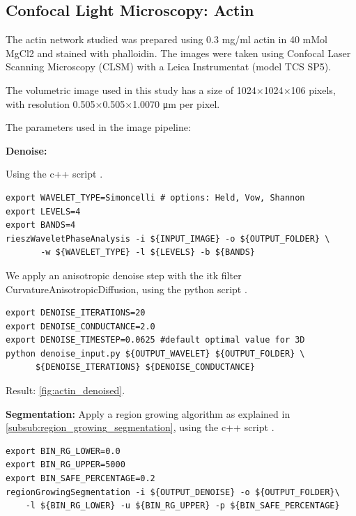 \subsection{Confocal Light Microscopy: Actin}%
\label{sub:actin}
The actin network studied was prepared using 0.3 mg/ml actin in 40 mMol MgCl2 and stained with phalloidin.
The images were taken using Confocal Laser Scanning Microscopy (CLSM) with a Leica Instrumentat (model TCS SP5).

The volumetric image used in this study has a size of 1024$\times$1024$\times$106 pixels, with resolution 0.505$\times$0.505$\times$1.0070 \si{\micro\metre} per pixel.

The parameters used in the image pipeline:

\textbf{Denoise:}

\noindent Using the c++ script  \cite{phcerdan_rieszwaveletphaseanalysis_2018}.
\begin{verbatim}
export WAVELET_TYPE=Simoncelli # options: Held, Vow, Shannon
export LEVELS=4
export BANDS=4
rieszWaveletPhaseAnalysis -i ${INPUT_IMAGE} -o ${OUTPUT_FOLDER} \
       -w ${WAVELET_TYPE} -l ${LEVELS} -b ${BANDS}
\end{verbatim}

We apply an anisotropic denoise step with the itk filter CurvatureAnisotropicDiffusion,
using the python script  \citetitle*{phcerdan_denoise_input_2018} \cite{phcerdan_denoise_input_2018}.

\begin{verbatim}
export DENOISE_ITERATIONS=20
export DENOISE_CONDUCTANCE=2.0
export DENOISE_TIMESTEP=0.0625 #default optimal value for 3D
python denoise_input.py ${OUTPUT_WAVELET} ${OUTPUT_FOLDER} \
      ${DENOISE_ITERATIONS} ${DENOISE_CONDUCTANCE}
\end{verbatim}

Result: \autoref{fig:actin_denoised}.

\textbf{Segmentation:}
Apply a region growing algorithm as explained in \autoref{subsub:region_growing_segmentation},
using the c++ script   \cite{phcerdan_regionGrowingSegmentation_2018}.
\begin{verbatim}
export BIN_RG_LOWER=0.0
export BIN_RG_UPPER=5000
export BIN_SAFE_PERCENTAGE=0.2
regionGrowingSegmentation -i ${OUTPUT_DENOISE} -o ${OUTPUT_FOLDER}\
    -l ${BIN_RG_LOWER} -u ${BIN_RG_UPPER} -p ${BIN_SAFE_PERCENTAGE}
\end{verbatim}

